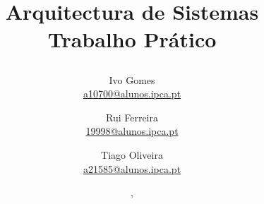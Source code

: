 

\title{
    \textbf{
        Arquitectura de Sistemas \\
        Trabalho Prático
    }
    
    \vspace{0.5cm}
}

\author{
    Ivo Gomes \\
    \href{mailto:a10700@alunos.ipca.pt}{a10700@alunos.ipca.pt}
  
    \and
    Rui Ferreira \\
    \href{mailto:19998@alunos.ipca.pt}{19998@alunos.ipca.pt}
  
    \and
    Tiago Oliveira \\
    \href{mailto:a21585@alunos.ipca.pt}{a21585@alunos.ipca.pt}

    \vspace{1cm}
}


\date{
    \themonth, \the\year
}